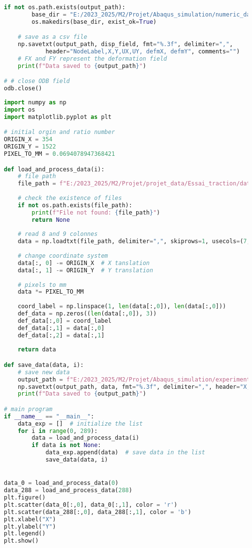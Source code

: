 \documentclass[12pt,a4paper]{article}
\begin{document}
\begin{lstlisting}[language=Python, caption={Extraction des champs numériques}]
    if not os.path.exists(output_path):
        base_dir = "E:/2023_2025/M2/Projet/Abaqus_simulation/numeric_data/champs_deformation"
        os.makedirs(base_dir, exist_ok=True)

    # save as a csv file
    np.savetxt(output_path, disp_field, fmt="%.3f", delimiter=",", 
            header="NodeLabel,X,Y,UX,UY, defmX, defmY", comments="")
    # FX and FY represent the deformation field
    print(f"Data saved to {output_path}")

# # close ODB field
odb.close()

\end{lstlisting}

\begin{lstlisting}[language=Python, caption={Convertion des données expérimentales}]
import numpy as np
import os
import matplotlib.pyplot as plt

# initial orgin and ratio number
ORIGIN_X = 354
ORIGIN_Y = 1522
PIXEL_TO_MM = 0.0694078947368421

def load_and_process_data(i):
    # file path 
    file_path = f"E:/2023_2025/M2/Projet/projet_data/Essai_traction/data_traction/alu_7075/image-00000{i:03}_0.csv"
    
    # check the existence of files
    if not os.path.exists(file_path):
        print(f"File not found: {file_path}")
        return None
    
    # read 8 and 9 colonnes
    data = np.loadtxt(file_path, delimiter=",", skiprows=1, usecols=(7, 8))
    
    # change coordinate system
    data[:, 0] -= ORIGIN_X  # X tanslation
    data[:, 1] -= ORIGIN_Y  # Y translation
    
    # pixels to mm
    data *= PIXEL_TO_MM
    
    coord_label = np.linspace(1, len(data[:,0]), len(data[:,0]))
    def_data = np.zeros((len(data[:,0]), 3))
    def_data[:,0] = coord_label
    def_data[:,1] = data[:,0]
    def_data[:,2] = data[:,1]
    
    return data

def save_data(data, i):
    # save new data
    output_path = f"E:/2023_2025/M2/Projet/Abaqus_simulation/experimental_data/exp_deformation_{i:03}.csv"
    np.savetxt(output_path, data, fmt="%.3f", delimiter=",", header="X, Y", comments="")
    print(f"Data saved to {output_path}")

# main program
if __name__ == "__main__":
    data_exp = []  # initialize the list
    for i in range(0, 289):
        data = load_and_process_data(i)
        if data is not None:
            data_exp.append(data)  # save data in the list
            save_data(data, i)


data_0 = load_and_process_data(0)
data_288 = load_and_process_data(288)
plt.figure()
plt.scatter(data_0[:,0], data_0[:,1], color = 'r')
plt.scatter(data_288[:,0], data_288[:,1], color = 'b')
plt.xlabel("X")
plt.ylabel("Y")
plt.legend()
plt.show()
\end{lstlisting}
\end{document}
